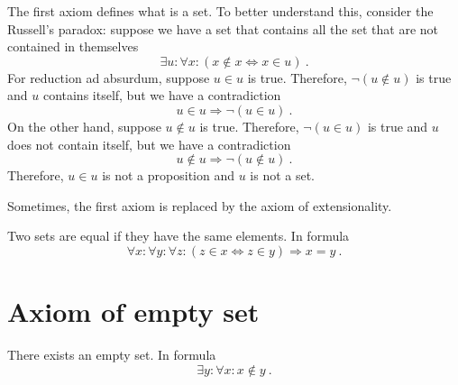     The first axiom defines what is a set. To better understand this, consider the Russell's paradox: suppose we have a set that contains all the set that are not contained in themselves
    \begin{equation*}
        \exists u \colon \forall x \colon (x \notin x \Leftrightarrow x \in u) ~.
    \end{equation*}
    For reduction ad absurdum, suppose $u \in u$ is true. Therefore, $\lnot (u \notin u)$ is true and $u$ contains itself, but we have a contradiction
    \begin{equation*}
        u \in u \Rightarrow \lnot (u \in u) ~.
    \end{equation*} 
    On the other hand, suppose $u \notin u$ is true. Therefore, $\lnot (u \in u)$ is true and $u$ does not contain itself, but we have a contradiction 
    \begin{equation*}
        u \notin u \Rightarrow \lnot(u \notin u) ~.
    \end{equation*}
    Therefore, $u \in u$ is not a proposition and $u$ is not a set.

    Sometimes, the first axiom is replaced by the axiom of extensionality. 
    \begin{axiom}[Extensionality]
        Two sets are equal if they have the same elements. In formula 
        \begin{equation*}
            \forall x \colon \forall y \colon \forall z \colon (z \in x \Leftrightarrow z \in y) \Rightarrow x=y ~.
        \end{equation*}
    \end{axiom}

\section{Axiom of empty set}

    \begin{axiom}
        There exists an empty set. In formula 
        \begin{equation*}
            \exists y \colon \forall x \colon x \notin y ~.
        \end{equation*}
    \end{axiom}

